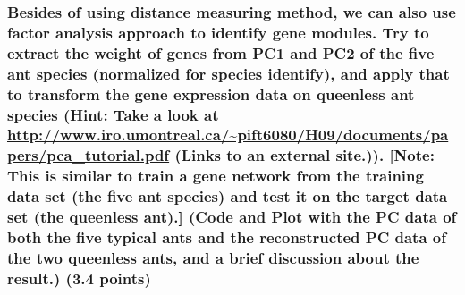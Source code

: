 \documentclass[]{article}
\begin{document}
\subsubsection{\texorpdfstring{Besides of using distance measuring
method, we can also use factor analysis approach to identify gene
modules. Try to extract the weight of genes from PC1 and PC2 of the five
ant species (normalized for species identify), and apply that to
transform the gene expression data on queenless ant species (Hint: Take
a look at
\url{http://www.iro.umontreal.ca/~pift6080/H09/documents/papers/pca_tutorial.pdf}
(Links to an external site.)). {[}Note: This is similar to train a gene
network from the training data set (the five ant species) and test it on
the target data set (the queenless ant).{]} (Code and Plot with the PC
data of both the five typical ants and the reconstructed PC data of the
two queenless ants, and a brief discussion about the result.) (3.4
points)}{Besides of using distance measuring method, we can also use factor analysis approach to identify gene modules. Try to extract the weight of genes from PC1 and PC2 of the five ant species (normalized for species identify), and apply that to transform the gene expression data on queenless ant species (Hint: Take a look at http://www.iro.umontreal.ca/\textasciitilde{}pift6080/H09/documents/papers/pca\_tutorial.pdf (Links to an external site.)). {[}Note: This is similar to train a gene network from the training data set (the five ant species) and test it on the target data set (the queenless ant).{]} (Code and Plot with the PC data of both the five typical ants and the reconstructed PC data of the two queenless ants, and a brief discussion about the result.) (3.4 points)}}\label{besides-of-using-distance-measuring-method-we-can-also-use-factor-analysis-approach-to-identify-gene-modules.-try-to-extract-the-weight-of-genes-from-pc1-and-pc2-of-the-five-ant-species-normalized-for-species-identify-and-apply-that-to-transform-the-gene-expression-data-on-queenless-ant-species-hint-take-a-look-at-httpwww.iro.umontreal.capift6080h09documentspaperspca_tutorial.pdf-links-to-an-external-site..-note-this-is-similar-to-train-a-gene-network-from-the-training-data-set-the-five-ant-species-and-test-it-on-the-target-data-set-the-queenless-ant.-code-and-plot-with-the-pc-data-of-both-the-five-typical-ants-and-the-reconstructed-pc-data-of-the-two-queenless-ants-and-a-brief-discussion-about-the-result.-3.4-points}
\end{document}
